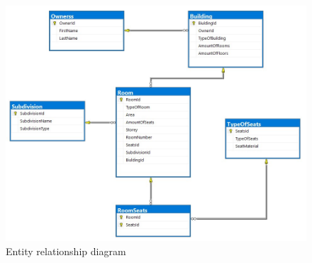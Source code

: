 \documentclass[a4paper,12pt]{article}
\begin{document}
	
	
	
\newpage
		\begin{figure}[h!]
		\begin{center}
			\begin{minipage}[h]{1.05\linewidth}
				\includegraphics[width=1\linewidth]{Prt sc/Entity relationship diagram.jpg}
			\end{minipage}
		\end{center}
		\caption{Entity relationship diagram}
	\end{figure}
	
	
	
\end{document}
